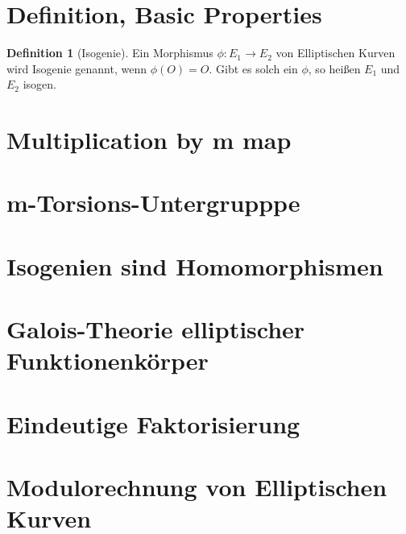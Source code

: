 \documentclass[english, german, parskip=half]{scrartcl}
\theoremstyle{definition}
\newtheorem{Definition}[Satz]{Definition}
\theoremstyle{remark}
\begin{document}



\section{Definition, Basic Properties}
\begin{Definition}[Isogenie]
  Ein Morphismus $\phi\colon E_1\to E_2$ von Elliptischen Kurven wird
  Isogenie genannt, wenn $\phi(O)=O$.
  Gibt es solch ein $\phi$, so heißen $E_1$ und $E_2$ isogen.
\end{Definition}


\section{Multiplication by m map}
\section{m-Torsions-Untergrupppe}
\section{Isogenien sind Homomorphismen}
\section{Galois-Theorie elliptischer Funktionenkörper}
\section{Eindeutige Faktorisierung}
\section{Modulorechnung von Elliptischen Kurven}

\nocite{*}
\printbibliography
\end{document}
